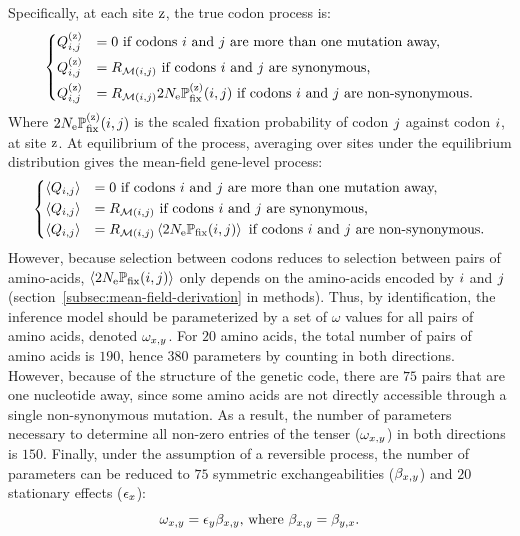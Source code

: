 \documentclass{article}
\begin{document}
Specifically, at each site $\text{z}$, the true codon process is:
\begin{equation}
 \begin{dcases}
 Q_{{i}, {j}}^{(\text{z})} & = 0 \text{ if codons ${i}$ and ${j}$ are more than one mutation away,} \\
 Q_{{i}, {j}}^{(\text{z})} & = R_{\mathcal{M}({i}, {j})} \text{ if codons ${i}$ and ${j}$ are {synonymous},} \\
 Q_{{i}, {j}}^{(\text{z})} & = R_{\mathcal{M}({i}, {j})} 2 N_{\text{e}} \mathbb{P}_{\text{fix}}^{(\text{z})}({i}, {j}) \text{ if codons ${i}$ and ${j}$ are non-synonymous}.
 \end{dcases}
 \label{eq:codon-site-processs}
\end{equation}
Where $2 N_{\text{e}} \mathbb{P}_{\text{fix}}^{(\text{z})}({i}, {j})$ is the scaled fixation probability of codon ${j}$ against codon ${i}$, at site $\text{z}$.
At equilibrium of the process, averaging over sites under the equilibrium distribution gives the mean-field gene-level process:
\begin{equation}
 \begin{dcases}
 \left\langle Q_{{i}, {j}} \right\rangle & = 0 \text{ if codons ${i}$ and ${j}$ are more than one mutation away,} \\
 \left\langle Q_{{i}, {j}} \right\rangle & = R_{\mathcal{M}({i}, {j})} \text{ if codons ${i}$ and ${j}$ are {synonymous},} \\
 \left\langle Q_{{i}, {j}} \right\rangle & = R_{\mathcal{M}({i}, {j})} \left\langle 2 N_{\text{e}} \mathbb{P}_{\text{fix}} ({i}, {j}) \right\rangle \text{ if codons ${i}$ and ${j}$ are non-synonymous}.
 \end{dcases}
 \label{eq:codon-avg-process}
\end{equation}
However, because selection between codons reduces to selection between pairs of amino-acids, $\left\langle 2 N_{\text{e}} \mathbb{P}_{\text{fix}} ({i}, {j}) \right\rangle$ only depends on the amino-acids encoded by ${i}$ and ${j}$ (section~\ref{subsec:mean-field-derivation} in methods).
Thus, by identification, the inference model should be parameterized by a set of $\omega$ values for all pairs of amino acids, denoted $\omega_{x, y}$.
For $20$ amino acids, the total number of pairs of amino acids is $190$, hence $380$ parameters by counting in both directions.
However, because of the structure of the genetic code, there are $75$ pairs that are one nucleotide away, since some amino acids are not directly accessible through a single {non-synonymous} mutation.
As a result, the number of parameters necessary to determine all non-zero entries of the tenser ($\omega_{x, y}$) in both directions is $150$.
Finally, under the assumption of a reversible process, the number of parameters can be reduced to $75$ symmetric exchangeabilities ($\beta_{x, y}$) and $20$ stationary effects ($\epsilon_{x}$):
\begin{equation}
 \omega_{x, y} = \epsilon_{y} \beta_{x, y}\text{, where } \beta_{x, y} = \beta_{y, x}.\label{eq:omega-reversible}
\end{equation}
\end{document}

